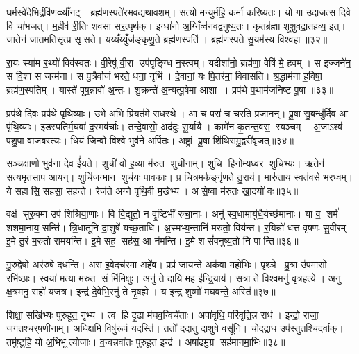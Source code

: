 घ॒र्मस्वे॑देभि॒र्द्रवि॑ण॒व्व्याँ॑नट्। ब्रह्म॑ण॒स्पते॑रभवद्यथाव॒शम्। स॒त्यो म॒न्युर्महि॒ कर्मा॑ करिष्य॒तः। यो गा उ॒दाज॒त्स दि॒वे वि चा॑भजत्। म॒हीव॑ री॒तिः शव॑सा सर॒त्पृथ॑क्। इन्धा॑नो अ॒ग्निँव्व॑नवद्वनुष्य॒तः। कृ॒तब्र॑ह्मा शूशुवद्रा॒तह॑व्य॒ इत्। जा॒तेन॑ जा॒तमति॒सृत्प्र सृसते। यय्यँ॒य्युँज॑ङ्कृणु॒ते ब्रह्म॑ण॒स्पति॑। ब्रह्म॑णस्पते सु॒यम॑स्य वि॒श्वहा॥३२॥

रा॒यः स्या॑म र॒थ्यो॑ विव॑स्वतः। वी॒रेषु॑ वी॒रा उप॑पृङ्ग्धि न॒स्त्वम्। यदीशा॑नो॒ ब्रह्म॑णा॒ वेषि॑ मे॒ हवम्। स इज्जने॑न॒ स वि॒शा स जन्म॑ना। स पु॒त्रैर्वाजं॑ भरते॒ धना॒ नृभि॑। दे॒वानां॒ यः पि॒तर॑मा॒ विवा॑सति। श्र॒द्धाम॑ना ह॒विषा॒ ब्रह्म॑ण॒स्पतिम्। यास्ते॑ पूष॒न्नावो॑ अ॒न्तः। शु॒क्रन्ते॑ अ॒न्यत्पू॒षेमा आशा। प्रप॑थे प॒थाम॑जनिष्ट पू॒षा ॥३३॥

प्रप॑थे दि॒वः प्रप॑थे पृथि॒व्याः। उ॒भे अ॒भि प्रि॒यत॑मे स॒धस्थे। आ च॒ परा॑ च चरति प्रजा॒नन्। पू॒षा सु॒बन्धु॑र्दि॒व आ पृ॑थि॒व्याः। इ॒डस्पति॑र्म॒घवा॑ द॒स्मव॑र्चाः। तन्दे॒वासो॒ अद॑दुः सू॒र्यायै। कामे॑न कृ॒तन्त॒वस॒ स्वञ्चम्। अ॒जाऽश्व॑ पशु॒पा वाज॑बस्त्यः। धि॒यं॒ जि॒न्वो विश्वे॒ भुव॑ने॒ अर्पि॑तः। अष्ट्रां पू॒षा शि॑थि॒रामु॒द्वरी॑वृजत्॥३४॥

स॒ञ्चक्षा॑णो॒ भुव॑ना दे॒व ई॑यते। शुची॑ वो ह॒व्या म॑रुत॒ शुची॑नाम्। शुचि हिनोम्यध्व॒र शुचि॑भ्यः। ऋ॒तेन॑ स॒त्यमृत॒साप॑ आयन्। शुचि॑जन्मान॒ शुच॑यः पाव॒काः। प्र चि॒त्रम॒र्कङ्गृ॑ण॒ते तु॒राय॑। मारु॑ताय॒ स्वत॑वसे भरध्वम्। ये सहासि॒ सह॑सा॒ सह॑न्ते। रेज॑ते अग्ने पृथि॒वी म॒खेभ्य॑। असे॒ष्वा म॑रुतः खा॒दयो॑ वः॥३५॥

वक्ष॑ सुरु॒क्मा उप॑ शिश्रिया॒णाः। वि वि॒द्युतो॒ न वृ॒ष्टिभी॑ रुचा॒नाः। अनु॑ स्व॒धामायु॑धै॒र्यच्छ॑मानाः। या व॒ शर्म॑ शशमा॒नाय॒ सन्ति॑। त्रि॒धातू॑नि दा॒शुषे॑ यच्छ॒ताधि॑। अ॒स्मभ्य॒न्तानि॑ मरुतो॒ विय॑न्त। र॒यिन्नो॑ धत्त वृषणः सु॒वीरम्। इ॒मे तु॒रं म॒रुतो॑ रामयन्ति। इ॒मे सह॒ सह॑स॒ आ न॑मन्ति। इ॒मे शसं॑वनुष्य॒तो नि पान्ति॥३६॥

गु॒रुद्वेषो॒ अर॑रुषे दधन्ति। अ॒रा इ॒वेदच॑रमा॒ अहे॑व। प्रप्र॑ जायन्ते॒ अक॑वा॒ महो॑भिः। पृश्ञे प्रु॒त्रा उ॑प॒मासो॒ रभि॑ष्ठाः। स्वया॑ म॒त्या म॒रुत॒ सं मि॑मिक्षुः। अनु॑ ते दायि म॒ह इ॑न्द्रि॒याय॑। स॒त्रा ते॒ विश्व॒मनु॑ वृत्र॒हत्ये। अनु॑ क्ष॒त्रमनु॒ सहो॑ यजत्र। इन्द्र॑ दे॒वेभि॒रनु॑ ते नृ॒षह्ये। य इन्द्र॒ शुष्मो॑ मघवन्ते॒ अस्ति॑॥३७॥

शिक्षा॒ सखि॑भ्यः पुरुहूत॒ नृभ्य॑। त्व हि दृ॒ढा म॑घव॒न्विचे॑ताः। अपा॑वृधि॒ परि॑वृति॒न्न राध॑। इन्द्रो॒ राजा॒ जग॑तश्चर्‌षणी॒नाम्। अ॒धि॒क्षमि॒ विषु॑रूपं॒ यदस्ति॑। ततो॑ ददातु दा॒शुषे॒ वसू॑नि। चोद॒द्राध॒ उप॑स्तुतश्चिद॒र्वाक्। तमु॑ष्टुहि॒ यो अ॒भिभूत्योजाः। व॒न्वन्नवा॑तः पुरुहू॒त इन्द्र॑। अषा॑ढमु॒ग्र सह॑मानमा॒भिः॥३८॥

